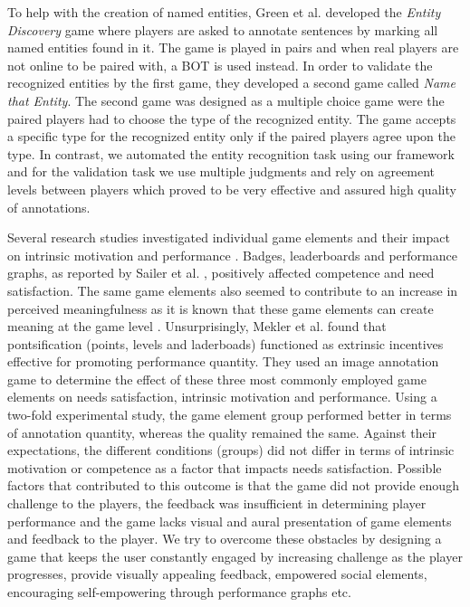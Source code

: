 To help with the creation of named entities, Green et al. \cite{50} developed the \textit{Entity Discovery} game where players are asked to annotate sentences by marking all named entities found in it. The game is played in pairs and when real players are not online to be paired with, a BOT is used instead. In order to validate the recognized entities by the first game, they developed a second game called \textit{Name that Entity}. The second game was designed as a multiple choice game were the paired players had to choose the type of the recognized entity. The game accepts a specific type for the recognized entity only if the paired players agree upon the type. \cite{50} 
In contrast, we automated the entity recognition task using our framework and for the validation task we use multiple judgments and rely on agreement levels between players which proved to be very effective and assured high quality of annotations. 

Several research studies investigated individual game elements and their impact on intrinsic motivation and performance \cite{43,45,46}. Badges, leaderboards and performance graphs, as reported by Sailer et al. \cite{45}, positively affected competence and need satisfaction. The same game elements also seemed to contribute to an increase in perceived meaningfulness as it is known that these game elements can create meaning at the game level \cite{45}. Unsurprisingly, Mekler et al. \cite{46} found that pontsification (points, levels and laderboads) functioned as extrinsic incentives effective for promoting performance quantity. They used an image annotation game to determine the effect of these three most commonly employed game elements on needs satisfaction, intrinsic motivation and performance. Using a two-fold experimental study, the game element group performed better in terms of annotation quantity, whereas the quality remained the same. Against their expectations, the different conditions (groups) did not differ in terms of intrinsic motivation or competence as a factor that impacts needs satisfaction. Possible factors that contributed to this outcome is that the game did not provide enough challenge to the players, the feedback was insufficient in determining player performance and the game lacks visual and aural presentation of game elements and feedback to the player. We try to overcome these obstacles by designing a game that keeps the user constantly engaged by increasing challenge as the player progresses, provide visually appealing feedback, empowered social elements, encouraging self-empowering through performance graphs etc. 